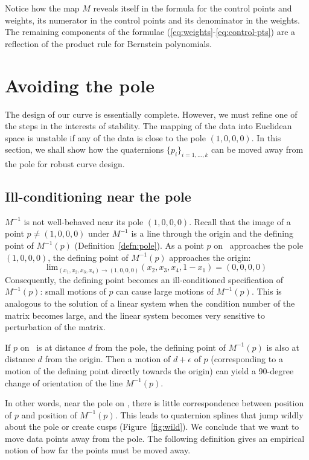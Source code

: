 Notice how the map $M$ reveals itself in the formula for the control points
and weights, its numerator in the control points and its denominator
in the weights.
The remaining components of the formulae (\ref{eq:weights}-\ref{eq:control-pts})
are a reflection of the product rule for Bernstein polynomials.

\section{Avoiding the pole}
\label{sec:avoid}

The design of our curve is essentially complete.
However, we must refine one of the steps in the interests of stability.
The mapping of the data into Euclidean space is unstable
if any of the data is close to the pole $(1,0,0,0)$.
In this section, we shall show how the quaternions $\{p_i\}_{i=1,\ldots,k}$
can be moved away from the pole for robust curve design.

\subsection{Ill-conditioning near the pole}
\label{sec:ill}

$M^{-1}$ is not well-behaved near 
its pole $(1,0,0,0)$.
Recall that the image of a point $p \neq (1,0,0,0)$ 
under $M^{-1}$ is a line through the
origin and the defining point of $M^{-1}(p)$ (Definition~\ref{defn:pole}).
As a point $p$ on \ approaches the pole $(1,0,0,0)$,
the defining point of $M^{-1}(p)$ approaches the origin:
\[ 
\mbox{lim}_{(x_1,x_2,x_3,x_4) \rightarrow (1,0,0,0)} (x_2,x_3,x_4,1-x_1)
= (0,0,0,0) 
\]
Consequently, the defining point becomes an ill-conditioned specification
of $M^{-1}(p)$:
small motions of $p$ can cause large motions of $M^{-1}(p)$.
This is analogous to the solution of a linear
system when the condition number of the matrix becomes large,
and the linear system becomes very sensitive to perturbation of the matrix.

\begin{example}
If $p$ on \ is at distance $d$ from the pole,
the defining point of $M^{-1}(p)$ is also at distance $d$ from the
origin.
Then a motion of $d+\epsilon$ of $p$ (corresponding to a motion
of the defining point directly towards the origin) can yield
a 90-degree change of orientation of the line $M^{-1}(p)$.
\end{example}

In other words, near the pole on , there is little correspondence 
between position of $p$ and position of $M^{-1}(p)$.
This leads to quaternion splines that jump wildly about the pole 
or create cusps (Figure~\ref{fig:wild}).
We conclude that we want to move data points away from the pole.
The following definition gives an empirical notion of how far the points
must be moved away.

